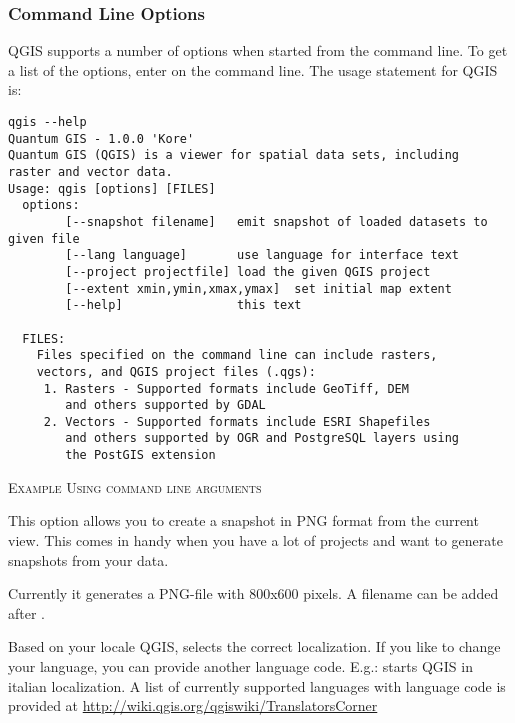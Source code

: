 \subsubsection{Command Line Options}
\label{label_commandline}

\nix QGIS supports a number of options when started from the command line. To
get a list of the options, enter  on the command line.
The usage statement for QGIS is:

\small
\begin{verbatim}
qgis --help
Quantum GIS - 1.0.0 'Kore'
Quantum GIS (QGIS) is a viewer for spatial data sets, including
raster and vector data.
Usage: qgis [options] [FILES]
  options:
        [--snapshot filename]   emit snapshot of loaded datasets to given file
        [--lang language]       use language for interface text
        [--project projectfile] load the given QGIS project
        [--extent xmin,ymin,xmax,ymax]  set initial map extent
        [--help]                this text

  FILES:
    Files specified on the command line can include rasters,
    vectors, and QGIS project files (.qgs):
     1. Rasters - Supported formats include GeoTiff, DEM
        and others supported by GDAL
     2. Vectors - Supported formats include ESRI Shapefiles
        and others supported by OGR and PostgreSQL layers using
        the PostGIS extension
\end{verbatim}
\normalsize

\begin{Tip} \caption{\textsc{Example Using command line arguments}}
\end{Tip}

This option allows you to create a snapshot in PNG format from the current view.
This comes in handy when you have a lot of projects and want to 
generate snapshots from your data.

Currently it generates a PNG-file with 800x600 pixels. A filename can be added after
.

Based on your locale QGIS, selects the correct localization. If you like to 
change your language, you can provide another language code. E.g.: 
starts QGIS in italian localization. A list of currently supported
languages with language code is provided at
\url{http://wiki.qgis.org/qgiswiki/TranslatorsCorner} 

